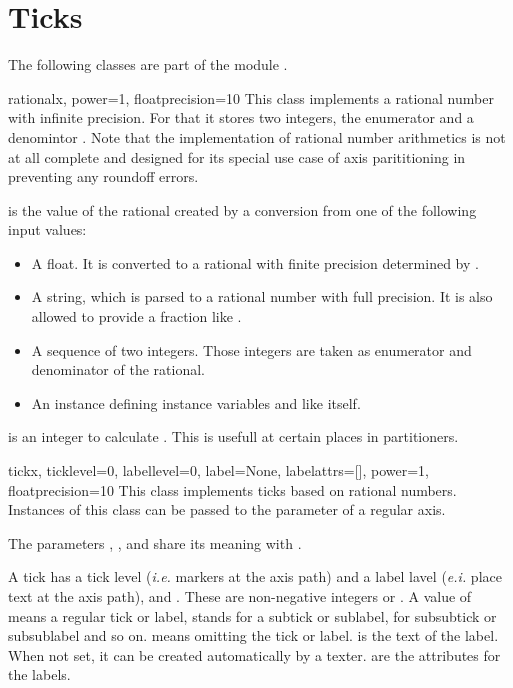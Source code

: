 \section{Ticks}


The following classes are part of the module .

\begin{classdesc}{rational}{x, power=1, floatprecision=10}
  This class implements a rational number with infinite precision. For
  that it stores two integers, the enumerator  and a
  denomintor . Note that the implementation of rational
  number arithmetics is not at all complete and designed for its
  special use case of axis parititioning in \PyX{} preventing any
  roundoff errors.

   is the value of the rational created by a conversion from
  one of the following input values:
  \begin{itemize}
  \item A float. It is converted to a rational with finite precision
    determined by .
  \item A string, which is parsed to a rational number with full
    precision. It is also allowed to provide a fraction like
    .
  \item A sequence of two integers. Those integers are taken as
    enumerator and denominator of the rational.
  \item An instance defining instance variables  and
   like  itself.
  \end{itemize}

   is an integer to calculate .
  This is usefull at certain places in partitioners.
\end{classdesc}

\begin{classdesc}{tick}{x, ticklevel=0, labellevel=0, label=None,
                        labelattrs=[], power=1, floatprecision=10}
  This class implements ticks based on rational numbers. Instances of
  this class can be passed to the  parameter of a
  regular axis.

  The parameters , , and  share
  its meaning with .

  A tick has a tick level (\emph{i.e.} markers at the axis path) and a
  label lavel (\emph{e.i.} place text at the axis path),
   and . These are non-negative
  integers or . A value of  means a regular tick or
  label,  stands for a subtick or sublabel,  for
  subsubtick or subsublabel and so on.  means omitting the
  tick or label.  is the text of the label. When not set,
  it can be created automatically by a texter.  are
  the attributes for the labels.
\end{classdesc}

